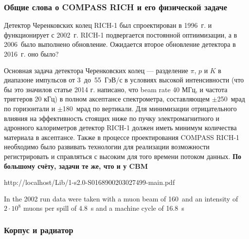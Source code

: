 




\subsubsection{Общие слова о COMPASS RICH и его физической задаче}

Детектор Черенковских колец \mbox{RICH-1} был спроектирован в 1996~г. и функционирует с 2002~г. \mbox{RICH-1} подвергается постоянной оптиимизации, а в 2006~было выполнено обновление. Ожидается второе обновление детектора в 2016~г. \todo оно было?

Основная задача детектора Черенковских колец --- разделение $\pi$, $p$ и $K$ в диапазоне импульсов от 3~до~55~ГэВ/с в условиях высокой интенсивности (что бы это значило\todo в статье 2014 г. написано, что beam rate 40 МГц, и частота триггеров 20 кГц) в полном аксептансе спектрометра, составляющем $\pm$250~мрад по горизонтали и $\pm$180~мрад по вертикали. Для минимизации отрицательного влияния на эффективность стоящих ниже по пучку электромагнитного и адронного калориметров детектор \mbox{RICH-1} должен иметь минимум количества материала в аксептансе. Также в процессе проектирования COMPASS \mbox{RICH-1} необходимо было развивать технологии для реализации возможности регистрировать и справляться с высоким для того времени потоком данных.
\todo \textbf{По большому счёту, задачи те же, что и у CBM}

http://localhost/Lib/1-s2.0-S0168900203027499-main.pdf

In the 2002 run data were taken with a muon beam of 160~\GeVoverC and an intensity of $2 \cdot 10^{8}$ muons per spill of 4.8~s and a machine cycle of 16.8~s

\subsubsection{Корпус и радиатор}

